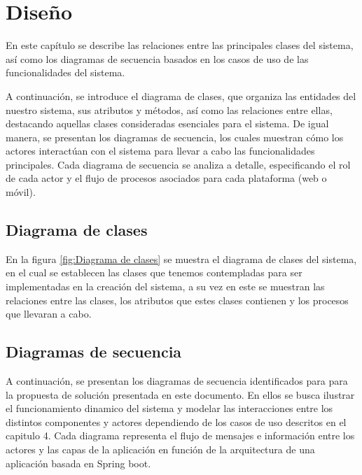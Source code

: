 \chapter{Diseño}

En este capítulo se describe las relaciones entre las principales clases del sistema, así como los diagramas de secuencia basados en los casos de uso de las funcionalidades del sistema. 

A continuación, se introduce el diagrama de clases, que organiza las entidades del nuestro sistema, sus atributos y métodos, así como las relaciones entre ellas, destacando aquellas clases consideradas esenciales para el sistema. De igual manera, se presentan los diagramas de secuencia, los cuales muestran cómo los actores interactúan con el sistema para llevar a cabo las funcionalidades principales. Cada diagrama de secuencia se analiza a detalle, especificando el rol de cada actor y el flujo de procesos asociados para cada plataforma (web o móvil).


\section{Diagrama de clases}

En la figura \ref{fig:Diagrama de clases} se muestra el diagrama de clases del sistema, en el cual se establecen las clases que tenemos contempladas para ser implementadas en la creación del sistema, a su vez en este se muestran las relaciones entre las clases, los atributos que estes clases contienen y los procesos que llevaran a cabo.

\newpage




\section{Diagramas de secuencia}

A continuación, se presentan los diagramas de secuencia identificados para para la propuesta de solución presentada en este documento.
En ellos se busca ilustrar el funcionamiento dinamico del sistema y modelar las interacciones entre los distintos componentes y actores dependiendo de los casos de uso descritos en el capitulo 4. 
Cada diagrama representa el flujo de mensajes e información entre los actores y las capas de la aplicación en función de la arquitectura de una aplicación basada en Spring boot.

